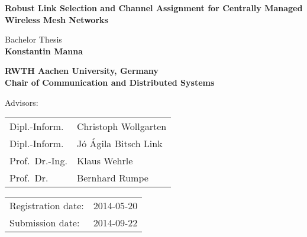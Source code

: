 \titlehead{
	\centering
	\texttt{[image: logos/comsys-text]}
	\hfill
	\texttt{[image: logos/rwth]}
} %

\begin{titlepage}

\let\footnotesize\small \let\footnoterule\relax

\hbox{}
\vfill

\centering

\begin{doublespace}
{ \huge\textbf{\textsf{Robust Link Selection and Channel Assignment for Centrally Managed Wireless Mesh Networks
}}}
\end{doublespace}
\vskip 2cm

{\large Bachelor Thesis\\[5pt]}
{\large \textbf{Konstantin Manna}}
\vskip 1cm

\textbf{RWTH Aachen University, Germany\\[5pt]
        Chair of Communication and Distributed Systems}
\vskip 2cm

\large

Advisors:
\vskip 2mm

\begin{tabular}{R{7cm}p{7cm}}
Dipl.-Inform. & Christoph Wollgarten\\
Dipl.-Inform. & J\'o \'Agila Bitsch Link\\
Prof.~Dr.-Ing. & Klaus Wehrle\\
Prof.~Dr. & Bernhard Rumpe
\end{tabular}
\vskip 1cm

\begin{tabular}{R{6cm}p{6cm}}
Registration date:  & 2014-05-20 \\
Submission date:    & 2014-09-22 \\
\end{tabular}

\vfill

\end{titlepage}


